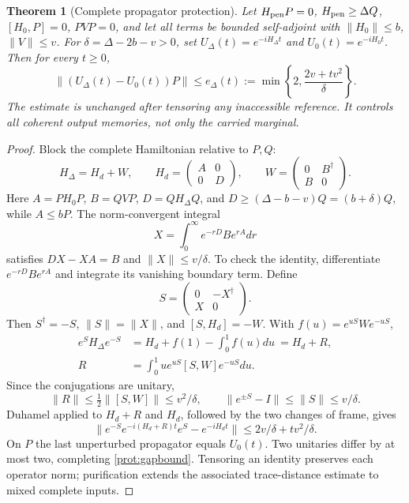 \documentclass[11pt,oneside,openany]{book}
\newtheorem{theorem}{Theorem}[chapter]
\theoremstyle{definition}
\theoremstyle{remark}\newtheorem{remark}[theorem]{Remark}
\begin{document}
\begin{theorem}[Complete propagator protection]
\label{prot:gap}
Let $H_{\rm pen}P=0$, $H_{\rm pen}\ge\Delta Q$, $[H_0,P]=0$, $PVP=0$, and let all terms be bounded self-adjoint with $\|H_0\|\le b$, $\|V\|\le v$. For $\delta=\Delta-2b-v>0$, set $U_\Delta(t)=e^{-iH_\Delta t}$ and $U_0(t)=e^{-iH_0t}$. Then for every $t\ge0$,
\begin{equation}
 \|(U_\Delta(t)-U_0(t))P\|
 \le e_\Delta(t):=\min\left\{2,\frac{2v+tv^2}{\delta}\right\}.
 \label{prot:gapbound}
\end{equation}
The estimate is unchanged after tensoring any inaccessible reference. It controls all coherent output memories, not only the carried marginal.
\end{theorem}
\begin{proof}
Block the complete Hamiltonian relative to $P,Q$:
\[
 H_\Delta=H_d+W,
 \qquad H_d=\begin{pmatrix}A&0\\0&D\end{pmatrix},
 \qquad W=\begin{pmatrix}0&B^\dagger\\B&0\end{pmatrix}.
\]
Here $A=PH_0P$, $B=QVP$, $D=QH_\Delta Q$, and
$D\ge(\Delta-b-v)Q=(b+\delta)Q$, while $A\le bP$. The norm-convergent integral
\[
 X=\int_0^\infty e^{-rD}Be^{rA}dr
\]
satisfies $DX-XA=B$ and $\|X\|\le v/\delta$. To check the identity, differentiate $e^{-rD}Be^{rA}$ and integrate its vanishing boundary term. Define
\[
 S=\begin{pmatrix}0&-X^\dagger\\X&0\end{pmatrix}.
\]
Then $S^\dagger=-S$, $\|S\|=\|X\|$, and $[S,H_d]=-W$. With $f(u)=e^{uS}We^{-uS}$,
\begin{align*}
 e^SH_\Delta e^{-S}
 &=H_d+f(1)-\int_0^1f(u)du\ =H_d+R,\\
 R&=\int_0^1u e^{uS}[S,W]e^{-uS}du.
\end{align*}
Since the conjugations are unitary,
\[
 \|R\|\le\tfrac12\|[S,W]\|\le v^2/\delta,
 \qquad\|e^{\pm S}-I\|\le\|S\|\le v/\delta.
\]
Duhamel applied to $H_d+R$ and $H_d$, followed by the two changes of frame, gives
\[
 \|e^{-S}e^{-i(H_d+R)t}e^S-e^{-iH_dt}\|
 \le2v/\delta+tv^2/\delta.
\]
On $P$ the last unperturbed propagator equals $U_0(t)$. Two unitaries differ by at most two, completing \eqref{prot:gapbound}. Tensoring an identity preserves each operator norm; purification extends the associated trace-distance estimate to mixed complete inputs.
\end{proof}
\end{document}
